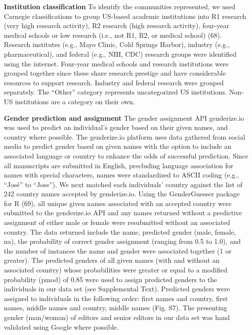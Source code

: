 \documentclass[11pt,]{article}
\begin{document}
\textbf{Institution classification} To identify the communities
represented, we used Carnegie classifications to group US-based academic
institutions into R1 research (very high research activity), R2 research
(high research activity), four-year medical schools or low research
(i.e., not R1, R2, or medical school) (68). Research institutes (e.g.,
Mayo Clinic, Cold Springs Harbor), industry (e.g., pharmaceutical), and
federal (e.g., NIH, CDC) research groups were identified using the
internet. Four-year medical schools and research institutions were
grouped together since these share research prestige and have
considerable resources to support research. Industry and federal
research were grouped separately. The ``Other'' category represents
uncategorized US institutions. Non-US institutions are a category on
their own.

\textbf{Gender prediction and assignment} The gender assignment API
genderize.io was used to predict an individual's gender based on their
given names, and country where possible. The genderize.io platform uses
data gathered from social media to predict gender based on given names
with the option to include an associated language or country to enhance
the odds of successful prediction. Since all manuscripts are submitted
in English, precluding language association for names with special
characters, names were standardized to ASCII coding (e.g., ``José'' to
``Jose''). We next matched each individuals' country against the list of
242 country names accepted by genderize.io. Using the GenderGuesser
package for R (69), all unique given names associated with an accepted
country were submitted to the genderize.io API and any names returned
without a predictive assignment of either male or female were
resubmitted without an associated country. The data returned include the
name, predicted gender (male, female, na), the probability of correct
gender assignment (ranging from 0.5 to 1.0), and the number of instances
the name and gender were associated together (1 or greater). The
predicted genders of all given names (with and without an associated
country) whose probabilities were greater or equal to a modified
probability (pmod) of 0.85 were used to assign predicted genders to the
individuals in our data set (see Supplemental Text). Predicted genders
were assigned to individuals in the following order: first names and
country, first names, middle names and country, middle names (Fig. S7).
The presenting gender (man/woman) of editors and senior editors in our
data set was hand validated using Google where possible.
\end{document}
